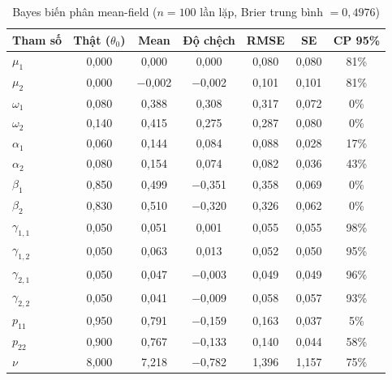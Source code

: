 \documentclass[11pt,a4paper]{article}
\begin{document}
\begin{table}[H]\centering\footnotesize
\caption{Bayes biến phân mean-field ($n=100$ lần lặp, Brier trung bình $=0,4976$)}
\begin{tabularx}{\textwidth}{l C C C C C C}
\toprule
\textbf{Tham số} & \textbf{Thật ($\theta_0$)} & \textbf{Mean} & \textbf{Độ chệch} & \textbf{RMSE} & \textbf{SE} & \textbf{CP 95\%} \\
\midrule
$\mu_1$ & 0,000 & 0,000 & 0,000 & 0,080 & 0,080 & 81\% \\
$\mu_2$ & 0,000 & $-$0,002 & $-$0,002 & 0,101 & 0,101 & 81\% \\
$\omega_1$ & 0,080 & 0,388 & 0,308 & 0,317 & 0,072 & 0\% \\
$\omega_2$ & 0,140 & 0,415 & 0,275 & 0,287 & 0,080 & 0\% \\
$\alpha_1$ & 0,060 & 0,144 & 0,084 & 0,088 & 0,028 & 17\% \\
$\alpha_2$ & 0,080 & 0,154 & 0,074 & 0,082 & 0,036 & 43\% \\
$\beta_1$ & 0,850 & 0,499 & $-$0,351 & 0,358 & 0,069 & 0\% \\
$\beta_2$ & 0,830 & 0,510 & $-$0,320 & 0,326 & 0,062 & 0\% \\
$\gamma_{1,1}$ & 0,050 & 0,051 & 0,001 & 0,055 & 0,055 & 98\% \\
$\gamma_{1,2}$ & 0,050 & 0,063 & 0,013 & 0,052 & 0,050 & 95\% \\
$\gamma_{2,1}$ & 0,050 & 0,047 & $-$0,003 & 0,049 & 0,049 & 96\% \\
$\gamma_{2,2}$ & 0,050 & 0,041 & $-$0,009 & 0,058 & 0,057 & 93\% \\
$p_{11}$ & 0,950 & 0,791 & $-$0,159 & 0,163 & 0,037 & 5\% \\
$p_{22}$ & 0,900 & 0,767 & $-$0,133 & 0,140 & 0,044 & 58\% \\
$\nu$ & 8,000 & 7,218 & $-$0,782 & 1,396 & 1,157 & 75\% \\
\bottomrule
\end{tabularx}
\end{table}
\end{document}
